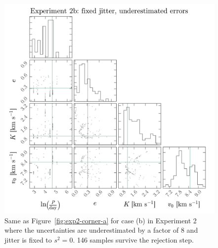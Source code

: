 \documentclass[manuscript, letterpaper]{aastex6}
\newcommand{\figname}{Figure}
\begin{document}
\begin{figure}[p]
\begin{center}
\includegraphics[width=\textwidth]{figures/exp2-corner-b.pdf}
\end{center}
\caption{%
Same as \figname~\ref{fig:exp2-corner-a} for case (b) in Experiment 2 where the
uncertainties are underestimated by a factor of 8 and jitter is fixed to
$s^2 = 0$.
146 samples survive the rejection step.
\label{fig:exp2-corner-b}}
\end{figure}
\end{document}
